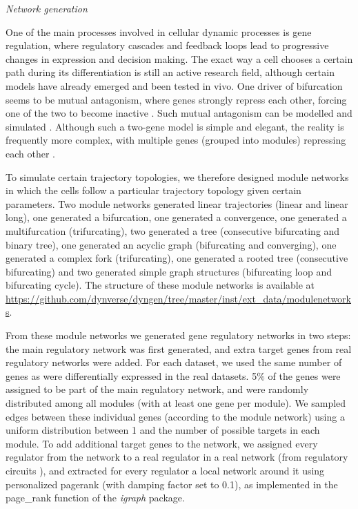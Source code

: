 \hfill\break
\textit{Network generation}
\hfill\break

One of the main processes involved in cellular dynamic processes is gene regulation, where regulatory cascades and feedback loops lead to progressive changes in expression and decision making. The exact way a cell chooses a certain path during its differentiation is still an active research field, although certain models have already emerged and been tested in vivo. One driver of bifurcation seems to be mutual antagonism, where genes \cite{xu_regulationbifurcatingcell_2015} strongly repress each other, forcing one of the two to become inactive \cite{graf_forcingcellschange_2009}. Such mutual antagonism can be modelled and simulated \cite{wang_quantifyingwaddingtonlandscape_2011,ferrell_bistabilitybifurcationswaddington_2012}. Although such a two-gene model is simple and elegant, the reality is frequently more complex, with multiple genes (grouped into modules) repressing each other \cite{yosef_dynamicregulatorynetwork_2013}.

To simulate certain trajectory topologies, we therefore designed module networks in which the cells follow a particular trajectory topology given certain parameters. Two module networks generated linear trajectories (linear and linear long), one generated a bifurcation, one generated a convergence, one generated a multifurcation (trifurcating), two generated a tree (consecutive bifurcating and binary tree), one generated an acyclic graph (bifurcating and converging), one generated a complex fork (trifurcating), one generated a rooted tree (consecutive bifurcating) and two generated simple graph structures (bifurcating loop and bifurcating cycle). The structure of these module networks is available at \href{https://github.com/dynverse/dyngen/tree/master/inst/ext\_data/modulenetworks}{https://github.com/dynverse/dyngen/tree/master/inst/ext\_data/modulenetworks}.

From these module networks we generated gene regulatory networks in two steps: the main regulatory network was first generated, and extra target genes from real regulatory networks  were added. For each dataset, we used the same number of genes as were differentially expressed in the real datasets. 5$\%$ of the genes were assigned to be part of the main regulatory network, and were randomly distributed among all modules (with at least one gene per module). We sampled edges between these individual genes (according to the module network) using a uniform distribution between 1 and the number of possible targets in each module. To add additional target genes to the network, we assigned every regulator from the network to a real regulator in a real network (from regulatory circuits \cite{marbach_tissuespecificregulatorycircuits_2016}), and extracted for every regulator a local network around it using personalized pagerank (with damping factor set to 0.1), as implemented in the page\_rank function of the \textit{igraph} package. 

